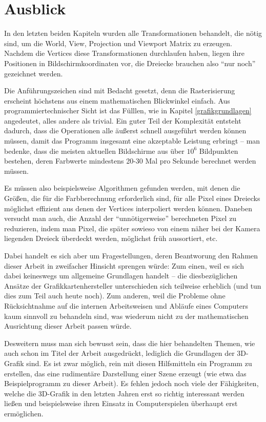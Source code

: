 \chapter{Ausblick}

In den letzten beiden Kapiteln wurden alle Transformationen behandelt, die nötig sind, um die World, View, Projection und Viewport Matrix zu erzeugen. Nachdem die Vertices diese Transformationen durchlaufen haben, liegen ihre Positionen in Bildschirmkoordinaten vor, die Dreiecke brauchen also \enquote{nur noch} gezeichnet werden.

Die Anführungszeichen sind mit Bedacht gesetzt, denn die Rasterisierung erscheint höchstens aus einem mathematischen Blickwinkel einfach. Aus programmiertechnischer Sicht ist das Fülllen, wie in Kapitel \ref{grafikgrundlagen} angedeutet, alles andere als trivial. Ein guter Teil der Komplexität entsteht dadurch, dass die Operationen alle äußerst schnell ausgeführt werden können müssen, damit das Programm insgesamt eine akzeptable Leistung erbringt -- man bedenke, dass die meisten aktuellen Bildschirme aus über $10^6$ Bildpunkten bestehen, deren Farbwerte mindestens 20-30 Mal pro Sekunde berechnet werden müssen.

Es müssen also beispielsweise Algorithmen gefunden werden, mit denen die Größen, die für die Farbberechnung erforderlich sind, für alle Pixel eines Dreiecks möglichst effizient aus denen der Vertices interpoliert werden können. Daneben versucht man auch, die Anzahl der \enquote{unnötigerweise} berechneten Pixel zu reduzieren, indem man Pixel, die später sowieso von einem näher bei der Kamera liegenden Dreieck überdeckt werden, möglichst früh aussortiert, etc.

Dabei handelt es sich aber um Fragestellungen, deren Beantworung den Rahmen dieser Arbeit in zweifacher Hinsicht sprengen würde: Zum einen, weil es sich dabei keineswegs um allgemeine Grundlagen handelt -- die diesbezüglichen Ansätze der Grafikkartenhersteller unterschieden sich teilweise erheblich (und tun dies zum Teil auch heute noch). Zum anderen, weil die Probleme ohne Rücksichtnahme auf die internen Arbeitsweisen und Abläufe eines Computers kaum sinnvoll zu behandeln sind, was wiederum nicht zu der mathematischen Ausrichtung dieser Arbeit passen würde.

Desweitern muss man sich bewusst sein, dass die hier behandelten Themen, wie auch schon im Titel der Arbeit ausgedrückt, lediglich die Grundlagen der 3D-Grafik sind. Es ist zwar möglich, rein mit diesen Hilfsmitteln ein Programm zu erstellen, das eine rudimentäre Darstellung einer Szene erzeugt (wie etwa das Beispielprogramm zu dieser Arbeit). Es fehlen jedoch noch viele der Fähigkeiten, welche die 3D-Grafik in den letzten Jahren erst so richtig interessant werden ließen und beispielsweise ihren Einsatz in Computerspielen überhaupt erst ermöglichen.


